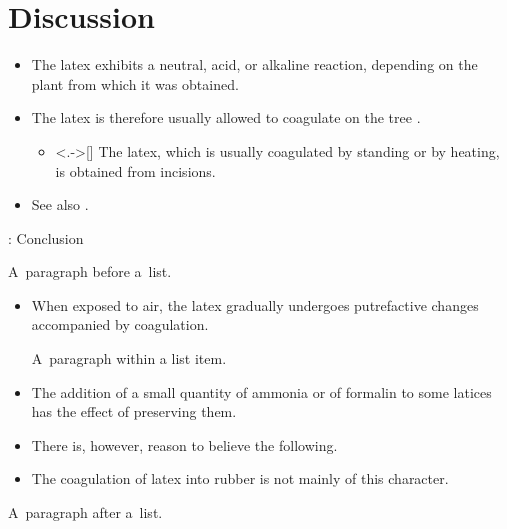 \section{Discussion}


\begin{frame}{\titleprefix}

	\begin{itemize}[<+->]
		\item The latex exhibits a neutral, acid, or alkaline reaction, depending on the plant from which it was obtained.
		\item The latex is therefore usually allowed to coagulate on the tree \citep{Koszegi2013}.
			\begin{itemize}
				\item<.->[\raisebox{0.75pt}{\scalebox{0.86}{$\Rightarrow$}}\!] The latex, which is usually coagulated by standing or by heating, is obtained from incisions.
			\end{itemize}
		\item See also \cite{Bordalo2013, Dohmen2012}.
	\end{itemize}

\end{frame}


\begin{frame}{\titleprefix: Conclusion}

	A~paragraph before a~list.

	\begin{itemize}
		\item When exposed to air, the latex gradually undergoes putrefactive changes accompanied by coagulation. \par
		A~paragraph within a list item.
		\item The addition of a small quantity of ammonia or of formalin to some latices has the effect of preserving them.
		\item There is, however, reason to believe the following.
		\item The coagulation of latex into rubber is not mainly of this character.
	\end{itemize}

	A~paragraph after a~list.

\end{frame}


